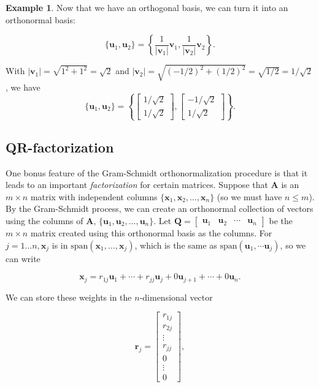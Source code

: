 \documentclass[
]{book}
\theoremstyle{definition}
\theoremstyle{definition}
\newtheorem{example}{Example}[chapter]
\theoremstyle{definition}
\theoremstyle{definition}
\theoremstyle{remark}
\begin{document}
\begin{examplebox}
\begin{example}
Now that we have an orthogonal basis, we can turn it into an orthonormal basis:

\[\{\mathbf{u}_1,\mathbf{u}_2\}=\left\{\frac{1}{|\mathbf{v}_1|}\mathbf{v}_1,\frac{1}{|\mathbf{v}_2|}\mathbf{v}_2\right\}.\]

With \(|\mathbf{v}_1|=\sqrt{1^2+1^2}=\sqrt{2}\) and
\(|\mathbf{v}_2|=\sqrt{(-1/2)^2+(1/2)^2}=\sqrt{1/2}=1/\sqrt{2}\), we have
\[\{\mathbf{u}_1,\mathbf{u}_2\}=\left\{\begin{bmatrix}1/\sqrt{2}\\1/\sqrt{2}\end{bmatrix},\begin{bmatrix}-1/\sqrt{2}\\1/\sqrt{2}\end{bmatrix}\right\}.\]
\end{example}

\end{examplebox}

\subsection*{QR-factorization}\label{qr-factorization}

One bonus feature of the Gram-Schmidt orthonormalization procedure is that it leads to an important \emph{factorization} for certain matrices. Suppose that \(\mathbf{A}\) is an \(m\times n\) matrix with independent columns \(\{\mathbf{x}_1,\mathbf{x}_2,\dots,\mathbf{x}_n\}\) (so we must have \(n\leq m\)). By the Gram-Schmidt process, we can create an orthonormal collection of vectors using the columns of \(\mathbf{A}\), \(\{\mathbf{u}_1 ,\mathbf{u}_2 ,\dots , \mathbf{u}_n\}.\) Let \(\mathbf{Q}=\begin{bmatrix}\mathbf{u}_1 & \mathbf{u}_2 & \cdots & \mathbf{u}_n\end{bmatrix}\) be the \(m\times n\) matrix created using this orthonormal basis as the columns. For \(j=1\dots n,\mathbf{x}_j\) is in \(\text{span}(\mathbf{x}_1,\dots,\mathbf{x}_j)\), which is the same as \(\text{span}(\mathbf{u}_1,\cdots \mathbf{u}_j)\), so we can write

\[\mathbf{x}_j=r_{1j}\mathbf{u}_1+\cdots+r_{jj}\mathbf{u}_j+0\mathbf{u}_{j+1}+\cdots+0\mathbf{u}_n.\]

We can store these weights in the \(n\)-dimensional vector

\[\mathbf{r}_j=\begin{bmatrix}r_{1j}\\r_{2j}\\ \vdots \\r_{jj}\\0\\ \vdots\\0\end{bmatrix},\]
\end{document}
